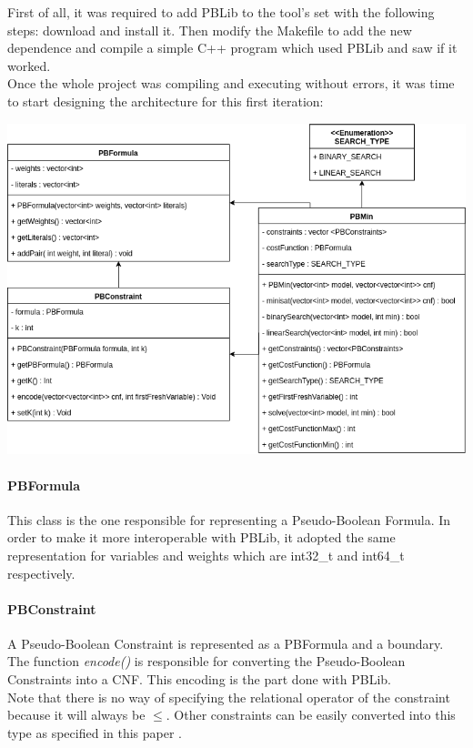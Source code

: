 First of all, it was required to add PBLib to the tool's set with the following steps: download and install it. Then modify the Makefile to add the new dependence and compile a simple C++ program which used PBLib and saw if it worked.  \\
Once the whole project was compiling and executing without errors, it was time to start designing the architecture for this first iteration: \\

\begin{center}
	\includegraphics[width=1\textwidth]{Figures/Iteration_1_Architecture.png}
	\label{it1arch}
\end{center}


\paragraph{PBFormula}

This class is the one responsible for representing a Pseudo-Boolean Formula. In order to make it more interoperable with PBLib, it adopted the same representation for variables and weights which are int32\_t and int64\_t respectively.  




\paragraph{PBConstraint} 

A Pseudo-Boolean Constraint is represented as a PBFormula and a boundary.  \\
The function \emph{encode()} is responsible for converting the Pseudo-Boolean Constraints into a CNF. This encoding is the part done with PBLib. \\
Note that there is no way of specifying the relational operator of the constraint because it will always be $\leq$.  Other constraints can be easily converted into this type as specified in this paper \cite{Abio}.

